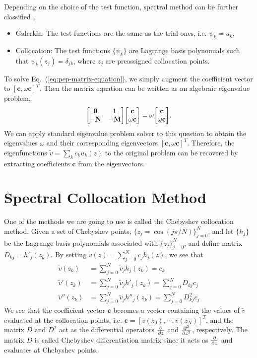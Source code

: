 Depending on the choice of the test function, spectral method can be further classified \cite{shen_tang_etal_spectral_2011},
\begin{itemize}
	\item Galerkin: The test functions are the same as the trial ones, i.e. $\psi_k=u_k$.
	\item Collocation:  The test functions $\{\psi_k\}$ are Lagrange basis polynomials such that $\psi_k(z_j)=\delta_{jk}$, where ${z_j}$ are preassigned collocation points.
\end{itemize}

To solve Eq.~(\ref{eq:pep-matrix-equation}), we simply augment the coefficient vector to $[\mathbf{c}, \omega\mathbf{c}]^T$. Then the matrix equation can be written as an algebraic eigenvalue problem,
\begin{equation} \label{eq:eigenvalue-problem}
	\mqty[ \mathbf{0} & \mathbf{1}\\ -\mathbf{N} & -\mathbf{M} ]\mqty[ \mathbf{c}\\ \omega\mathbf{c}] = \omega\mqty[ \mathbf{c}\\ \omega\mathbf{c}].
\end{equation}
We can apply standard eigenvalue problem solver to this question to obtain the eigenvalues $\omega$ and their corresponding eigenvectors $[\mathbf{c}, \omega\mathbf{c}]^T$. Therefore, the eigenfunctions $\tilde{v} = \sum_k c_ku_k(z)$ to the original problem can be recovered by extracting coefficients $\mathbf{c}$ from the eigenvectors.

\section{Spectral Collocation Method}
One of the methods we are going to use is called the Chebyshev collocation method.
Given a set of Chebyshev points, $\{z_j=\cos(j\pi/N)\}_{j=0}^{N}$, and let $\{h_j\}$ be the Lagrange basis polynomials associated with $\{z_j\}_{j=0}^{N}$, and define matrix $D_{kj} = h'_j(z_k)$. By setting $\tilde{v}(z) = \sum_{j=0}^{N}c_jh_j(z)$, we see that
\begin{align}
	\tilde{v}(z_k)   & = \sum_{j=0}^{N}\tilde{v}_jh_j(z_k) = c_k                         \\
	\tilde{v}'(z_k)  & = \sum_{j=0}^{N}\tilde{v}_jh'_j(z_k) = \sum_{j=0}^{N}D_{kj}c_j    \\
	\tilde{v}''(z_k) & = \sum_{j=0}^{N}\tilde{v}_jh''_j(z_k) = \sum_{j=0}^{N}D^2_{kj}c_j
\end{align}
We see that the coefficient vector $\mathbf{c}$ becomes a vector containing the values of $\tilde{v}$ evaluated at the collocation points, i.e. $\mathbf{c}=[v(z_0), \cdots, v(z_N)]^T$, and the matrix $D$ and $D^2$ act as the differential operators $\pdv{z}$ and $\pdv[2]{z}$, respectively. The matrix $D$ is called Chebyshev differentiation matrix since it acts as $\pdv{z}$ and evaluates at Chebyshev points.

